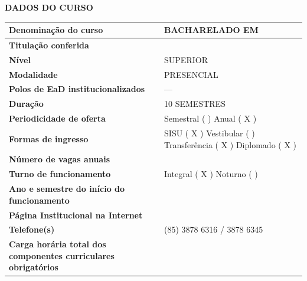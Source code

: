 \clearpage
\thispagestyle{empty}
\begin{center}
	\textbf{DADOS DO CURSO}
\end{center}

	\begin{table}[h!]
		\small
		\begin{tabular}{p{6cm}p{10cm}}
			\hline 
			\textbf{Denominação do curso} & \MakeUppercase{Bacharelado em \NOMEENG} \\ \hline
			
			\textbf{Titulação conferida} & \MakeUppercase{\NOMEEGRESSO} \\ \hline
			
			\textbf{Nível} & \MakeUppercase{SUPERIOR} \\ \hline
			
			\textbf{Modalidade} & \MakeUppercase{PRESENCIAL} \\ \hline
			
			\textbf{Polos de EaD institucionalizados} & --- \\ \hline
			
			\textbf{Duração} & \MakeUppercase{10 semestres} \\ \hline
			
			\textbf{Periodicidade de oferta} & Semestral ( ) \quad Anual ( X ) \\ \hline
			
			\textbf{Formas de ingresso} & 
			SISU ( X ) \quad Vestibular ( ) \quad Transferência ( X ) \quad Diplomado ( X ) \\ \hline
			
			\textbf{Número de vagas anuais} & \NUMVAGAS \\ \hline
			
			\textbf{Turno de funcionamento} & Integral ( X ) \quad Noturno ( ) \\ \hline
			
			\textbf{Ano e semestre do início do funcionamento} & \MakeUppercase{\SEMESTRE} \\ \hline
			
			\textbf{Página Institucional na Internet} & \web{\PAGINA} \\ \hline
			
			\textbf{Telefone(s)} & (85) 3878 6316 / 3878 6345 \\ \hline
			
			\textbf{Carga horária total dos componentes curriculares obrigatórios} & \CHTOTALDOB \\ \hline
			

\end{tabular}
\end{table}
